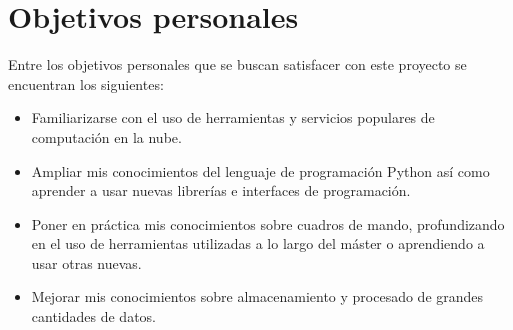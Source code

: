\section{Objetivos personales}

Entre los objetivos personales que se buscan satisfacer con este proyecto se encuentran los siguientes:

\begin{itemize}
    \item Familiarizarse con el uso de herramientas y servicios populares de computación en la nube.
    \item Ampliar mis conocimientos del lenguaje de programación Python así como aprender a usar nuevas librerías e interfaces de programación.
    \item Poner en práctica mis conocimientos sobre cuadros de mando, profundizando en el uso de herramientas utilizadas a lo largo del máster o aprendiendo a usar otras nuevas.
    \item Mejorar mis conocimientos sobre almacenamiento y procesado de grandes cantidades de datos.
\end{itemize}

